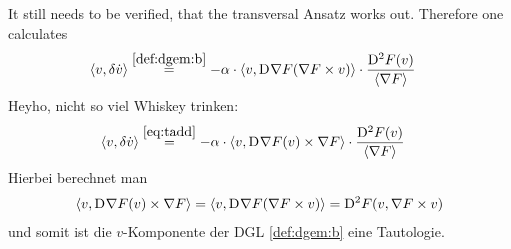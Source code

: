 It still needs to be verified, that the transversal Ansatz works out.
Therefore one calculates
\begin{align}
    \langle  v ,  \delta \dot{ v }  \rangle  &\overset{\eqref{def:dgem:b}}{=}
    -\alpha \cdot \langle  v ,  \mathrm{D}^{  }\nabla F( \nabla F \times v )  \rangle  \cdot
    \frac{ \mathrm{D}^{ 2 }F( v ) }{ \langle  \nabla F  \rangle }
\end{align}
Heyho, nicht so viel Whiskey trinken:
\begin{align}
    \langle  v ,  \delta \dot{ v }  \rangle  &\overset{\eqref{eq:tadd}}{=}
    -\alpha \cdot \langle  v ,  \mathrm{D}^{  }\nabla F( v ) \times \nabla F  \rangle  \cdot
    \frac{ \mathrm{D}^{ 2 }F( v ) }{ \langle  \nabla F   \rangle }
\end{align}
Hierbei berechnet man
\begin{align}
    \langle  v ,  \mathrm{D}^{  }\nabla F( v ) \times \nabla F  \rangle  =
    \langle  v ,  \mathrm{D}^{  }\nabla F( \nabla F \times v )  \rangle  =
    \mathrm{D}^{ 2 }F( v, \nabla F \times v )
\end{align}
und somit ist die $ v $-Komponente der DGL \eqref{def:dgem:b} eine Tautologie.



